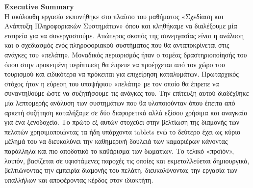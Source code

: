 \noindent
\textbf{Εxecutive Summary}\\

\noindent
Η ακόλουθη εργασία εκπονήθηκε στο πλαίσιο του μαθήματος «Σχεδίαση και 
Ανάπτυξη Πληροφοριακών Συστημάτων» όπου και κληθήκαμε να διαλέξουμε 
μία εταιρεία για να συνεργαστούμε. Απώτερος σκοπός της συνεργασίας είναι η
ανάλυση και ο σχεδιασμός ενός πληροφοριακού συστήματος που θα 
ανταποκρίνεται στις ανάγκες του «πελάτη». Μοναδικός περιορισμός ήταν ο 
τομέας δραστηριοποίησής του όπου στην προκειμένη περίπτωση θα έπρεπε 
να προέρχεται από τον χώρο του τουρισμού και ειδικότερα να πρόκειται για 
επιχείρηση καταλυμάτων. Πρωταρχικός στόχος ήταν η εύρεση του υποψήφιου 
«πελάτη» με τον οποίο θα έπρεπε να συναντηθούμε ώστε να συζητήσουμε τις 
ανάγκες του. Την επίτευξη αυτού διαδέχθηκε μία λεπτομερής ανάλυση των 
συστημάτων που θα υλοποιούνταν όπου έπειτα από αρκετή συζήτηση 
καταλήξαμε σε δύο διαφορετικά αλλά εξίσου χρήσιμα και αναγκαία για ένα 
ξενοδοχείο. Το πρώτο εξ αυτών στοχεύει στην βελτίωση της διαμονής των 
πελατών χρησιμοποιώντας τα ήδη υπάρχοντα tablets ενώ το δεύτερο έχει ως 
κύριο μέλημά του να διευκολύνει την καθημερινή δουλειά των καμαριέρων 
κάνοντας παράλληλα και πιο αποδοτικό το καθάρισμα των δωματίων.
Το τελικό «προϊόν», λοιπόν, βασίζεται σε υφιστάμενες παροχές τις οποίες και 
εκμεταλλεύεται δημιουργικά, βελτιώνοντας την εμπειρία διαμονής του πελάτη, 
διευκολύνοντας την εργασία των υπαλλήλων και αποφέροντας κέρδος στον
ιδιοκτήτη. 